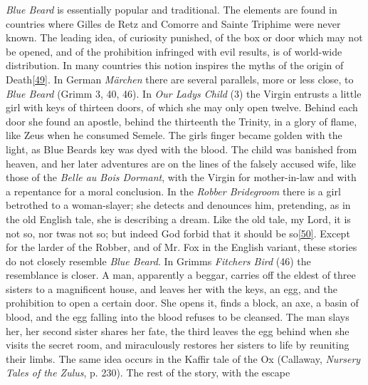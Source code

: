 \documentclass[14pt,a4paper]{memoir}
\begin{document}
\emph{Blue Beard} is essentially popular and traditional. The elements
are found in countries where Gilles de Retz and Comorre and Sainte
Triphime were never known. The leading idea, of curiosity punished, of
the box or door which may not be opened, and of the prohibition
infringed with evil results, is of world-wide distribution. In many
countries this notion inspires the myths of the origin of
Death\protect\hypertarget{4533318093929944247_33931-h-0.htm.xhtmlux5cux23FNanchor_49}{}{}\protect\hyperlink{4533318093929944247_33931-h-0.htm.xhtmlux5cux23Footnote_49}{{[}49{]}}.
In German \emph{Märchen} there are several parallels, more or less
close, to \emph{Blue Beard} (Grimm 3, 40, 46). In \emph{Our
Lady\textquotesingle s Child} (3) the Virgin entrusts a little girl with
keys of thirteen doors, of which she may only open twelve. Behind each
door she found an apostle, behind the thirteenth the Trinity, in a glory
of flame, like Zeus when he consumed Semele. The girl\textquotesingle s
finger became golden with the light, as Blue Beard\textquotesingle s key
was dyed with the blood. The child was banished from heaven, and her
later adventures are on the lines of the falsely accused wife, like
those of the \emph{Belle au Bois Dormant}, with the Virgin for
mother-in-law and with a repentance for a moral conclusion. In the
\emph{Robber Bridegroom} there is a girl betrothed to a woman-slayer;
she detects and denounces him, pretending, as in the old English tale,
she is describing a dream. \textquotesingle Like the old tale, my Lord,
it is not so, nor \textquotesingle twas not so; but indeed God forbid
that it should be
so\protect\hypertarget{4533318093929944247_33931-h-0.htm.xhtmlux5cux23FNanchor_50}{}{}\protect\hyperlink{4533318093929944247_33931-h-0.htm.xhtmlux5cux23Footnote_50}{{[}50{]}}.\textquotesingle{}
Except for the \textquotesingle larder\textquotesingle{} of the Robber,
and of Mr. Fox in the English variant, these stories do not closely
resemble \emph{Blue Beard}. In Grimm\textquotesingle s
\emph{Fitcher\textquotesingle s Bird} (46) the resemblance is closer. A
man, apparently a beggar, carries off the eldest of three sisters to a
magnificent house, and leaves her with the keys, an egg, and the
prohibition to open a certain door. She opens it, finds a block, an axe,
a basin of blood, and the egg falling into the blood refuses to be
cleansed. The man slays her, her second sister shares her fate, the
third leaves the egg behind when she visits the secret room, and
miraculously restores her sisters to life by reuniting their limbs. The
same idea occurs in the Kaffir tale of the Ox (Callaway, \emph{Nursery
Tales of the Zulus}, p. 230). The rest of the story, with the escape
\end{document}
